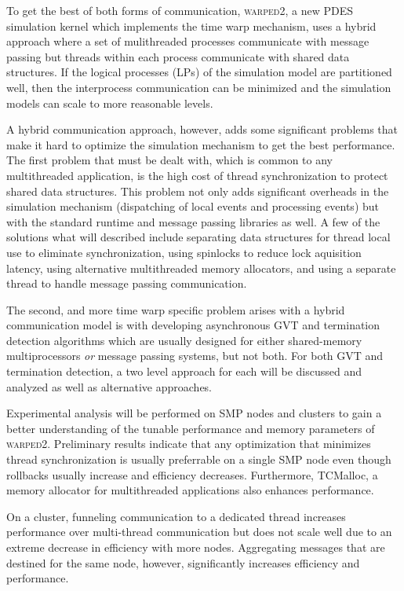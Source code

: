 \documentclass[11pt]{book}
\begin{document}
To get the best of both forms of communication, \textsc{warped2}, a new PDES simulation kernel
which implements the time warp mechanism, uses a hybrid approach where a set of mulithreaded
processes communicate with message passing but threads within each process communicate with
shared data structures. If the logical processes (LPs) of the simulation model are partitioned
well, then the interprocess communication can be minimized and the simulation models can scale
to more reasonable levels.

A hybrid communication approach, however, adds some significant problems that make it hard
to optimize the simulation mechanism to get the best performance. The first problem that
must be dealt with, which is common to any multithreaded application, is the high cost of thread
synchronization to protect shared data structures. This problem not only adds significant overheads
in the simulation mechanism (dispatching of local events and processing events) but with the
standard runtime and message passing libraries as well. A few of the solutions what will described
include separating data structures for thread local use to eliminate synchronization, using
spinlocks to reduce lock aquisition latency, using alternative multithreaded memory allocators,
and using a separate thread to handle message passing communication.

The second, and more time warp specific problem arises with a hybrid communication model is with
developing asynchronous GVT and termination detection algorithms which are usually designed for
either shared-memory multiprocessors \emph{or} message passing systems, but not both. For both
GVT and termination detection, a two level approach for each will be discussed and analyzed
as well as alternative approaches.

Experimental analysis will be performed on SMP nodes and clusters to gain a better understanding
of the tunable performance and memory parameters of \textsc{warped2}. Preliminary results
indicate that any optimization that minimizes thread synchronization is usually preferrable on
a single SMP node even though rollbacks usually increase and efficiency decreases. Furthermore,
TCMalloc, a memory allocator for multithreaded applications also enhances performance.

On a cluster, funneling communication to a dedicated thread increases performance over multi-thread
communication but does not scale well due to an extreme decrease in efficiency with more nodes.
Aggregating messages that are destined for the same node, however, significantly increases
efficiency and performance.
\end{document}
